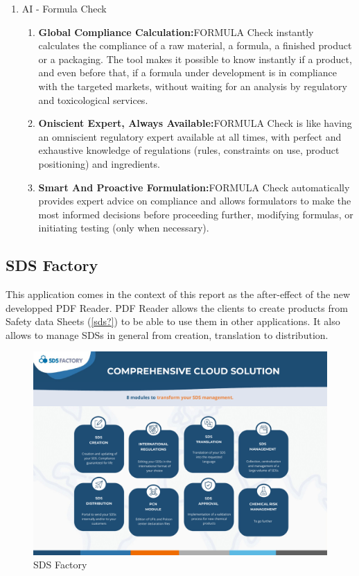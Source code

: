 \documentclass[a4paper,12pt,twoside]{report}
\begin{document}
\begin{enumerate}
\begin{enumerate}
\begin{itemize}
	\end{itemize}	
	\end{enumerate}
\item AI - Formula Check
	\begin{enumerate}
		\item \textbf{Global Compliance Calculation:}FORMULA Check instantly calculates the compliance of a raw 
material, a formula, a finished product or a packaging. The tool 
makes it possible to know instantly if a product, and even before that, if 
a formula under development is in compliance with the targeted 
markets, without waiting for an analysis by regulatory and toxicological 
services.
		\item \textbf{Oniscient Expert, Always Available:}FORMULA Check is like having an omniscient regulatory expert 
available at all times, with perfect and exhaustive knowledge of 
regulations (rules, constraints on use, product positioning) and 
ingredients.

		\item \textbf{Smart And Proactive Formulation:}FORMULA Check automatically provides expert advice on 
compliance and allows formulators to make the most informed 
decisions before proceeding further, modifying formulas, or initiating 
testing (only when necessary).
	\end{enumerate}
\end{enumerate}



\subsection{SDS Factory}
This application comes in the context of this report as the after-effect of the new developped PDF Reader. PDF Reader allows the clients to create products from Safety data Sheets (\ref{sds?}) to be able to use them in other applications. It also allows to manage SDSs in general from creation, translation to distribution.
\begin{figure}[H]
		\includegraphics[width=\textwidth]{images/sdsFactory}
	\caption[SDS Factory]{SDS Factory}
	\label{sdsfactory}
\end{figure}
\end{document}
